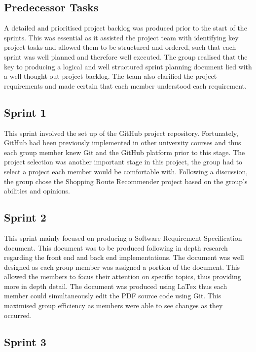 \documentclass[10pt, a4paper, onecolumn]{scrartcl}
\begin{document}
		\subsection{Predecessor Tasks} 
		
			A detailed and prioritised project backlog was produced prior to the start of the sprints. This was essential as it assisted the project team with identifying key project tasks and allowed them to be structured and ordered, such that each sprint was well planned and therefore well executed.  The group realised that the key to producing a logical and well structured sprint planning document lied with a well thought out project backlog. The team also clarified the project requirements and made certain that each member understood each requirement. 
			
		\subsection{Sprint 1}
			
			This sprint involved the set up of the GitHub project repository. Fortunately, GitHub had been previously implemented in other university courses and thus each group member knew Git and the GitHub platform prior to this stage. The project selection was another important stage in this project, the group had to select a project each member would be comfortable with. Following a discussion, the group chose the Shopping Route Recommender project based on the group's abilities and opinions. 
			
		\subsection{Sprint 2}
		
		  This sprint mainly focused on producing a Software Requirement Specification document. This document was to be produced following in depth research regarding the front end and back end implementations. The document was well designed as each group member was assigned a portion of the document. This allowed the members to focus their attention on specific topics, thus providing more in depth detail. The document was produced using LaTex thus each member could simultaneously edit the PDF source code using Git. This maximised group efficiency as members were able to see changes as they occurred.  
		
		\subsection{Sprint 3}
		
\end{document}
